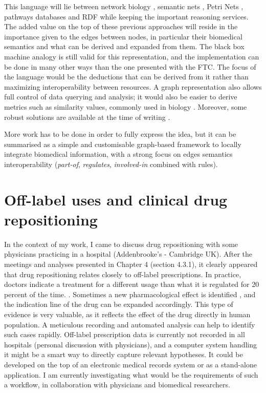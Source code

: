 This language will lie between network biology \citep{ravasz2002hierarchical}, semantic nets \citep{schubert1978structure}, Petri Nets \citep{murata1989petri}, pathways databases \citep{schaefer2009pid} and RDF while keeping the important reasoning services. The added value on the top of these previous approaches will reside in the importance given to the edges between nodes, in particular their biomedical semantics and what can be derived and expanded from them. The black box machine analogy is still valid for this representation, and the implementation can be done in many other ways than the one presented with the FTC. The focus of the language would be the deductions that can be derived from it rather than maximizing interoperability between resources. A graph representation also allows full control of data querying and analysis; it would also be easier to derive metrics such as similarity values, commonly used in biology \citep{stevens2007using}. Moreover, some robust solutions are available at the time of writing \citep{have2013graph}.

More work has to be done in order to fully express the idea, but it can be summarised as a simple and customisable graph-based framework to locally integrate biomedical information, with a strong focus on edges semantics interoperability (\emph{part-of}, \emph{regulates}, \emph{involved-in} combined with rules).

\section{Off-label uses and clinical drug repositioning}
In the context of my work, I came to discuss drug repositioning with some physicians practicing in a hospital (Addenbrooke's - Cambridge UK). After the meetings and analyses presented in Chapter 4 (section 4.3.1), it clearly appeared that drug repositioning relates closely to off-label prescriptions. In practice, doctors indicate a treatment for a different usage than what it is regulated for 20 percent of the time. \citep{cras2007off}. Sometimes a new pharmacological effect is identified \citep{stephens2009dark}, and the indication line of the drug can be expanded accordingly. This type of evidence is very valuable, as it reflects the effect of the drug directly in human population. A meticulous recording and automated analysis can help to identify such cases rapidly. Off-label prescription data is currently not recorded in all hospitals (personal discussion with physicians), and a computer system handling it might be a smart way to directly capture relevant hypotheses. It could be developed on the top of an electronic medical records system \citep{cras2007off} or as a stand-alone application. I am currently investigating what would be the requirements of such a workflow, in collaboration with physicians and biomedical researchers.

